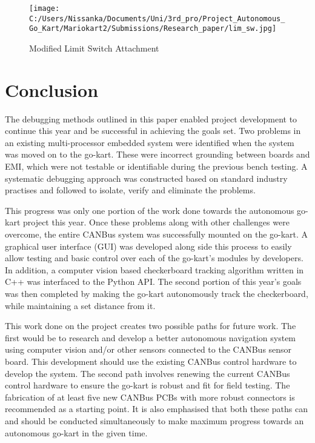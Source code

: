 \documentclass{ENZCon}
\begin{document}
\begin{figure}[htbp]
	\centering
		\texttt{[image: C:/Users/Nissanka/Documents/Uni/3rd\_pro/Project\_Autonomous\_Go\_Kart/Mariokart2/Submissions/Research\_paper/lim\_sw.jpg]}
	\caption{Modified Limit Switch Attachment}
	\label{fig:lim_sw}
\end{figure}




\section{Conclusion}

The debugging methods outlined in this paper enabled project development to continue this year and be successful in achieving the goals set. Two problems in an existing multi-processor embedded system were identified when the system was moved on to the go-kart. These were incorrect grounding between boards and EMI, which were not testable or identifiable during the previous bench testing. A systematic debugging approach was constructed based on standard industry practises and followed to isolate, verify and eliminate the problems. 

This progress was only one portion of the work done towards the autonomous go-kart project this year. Once these problems along with other challenges were overcome, the entire CANBus system was successfully mounted on the go-kart. A graphical user interface (GUI) was developed along side this process to easily allow testing and basic control over each of the go-kart's modules by developers. In addition, a computer vision based checkerboard tracking algorithm written in C++ was interfaced to the Python API. The second portion of this year's goals was then completed by making the go-kart autonomously track the checkerboard, while maintaining a set distance from it. 

This work done on the project creates two possible paths for future work. The first would be to research and develop a better autonomous navigation system using computer vision and/or other sensors connected to the CANBus sensor board. This development should use the existing CANBus control hardware to develop the system. The second path involves renewing the current CANBus control hardware to ensure the go-kart is robust and fit for field testing. The fabrication of at least five new CANBus PCBs with more robust connectors is recommended as a starting point. It is also emphasised that both these paths can and should be conducted simultaneously to make maximum progress towards an autonomous go-kart in the given time. 



\end{document}
